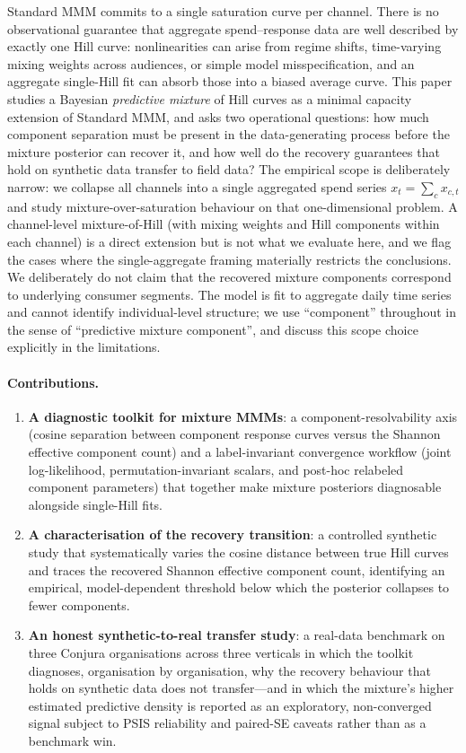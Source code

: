 \documentclass[11pt]{article}
\begin{document}
Standard MMM commits to a single saturation curve per channel. There is no observational guarantee that aggregate spend--response data are well described by exactly one Hill curve: nonlinearities can arise from regime shifts, time-varying mixing weights across audiences, or simple model misspecification, and an aggregate single-Hill fit can absorb those into a biased average curve. This paper studies a Bayesian \emph{predictive mixture} of Hill curves as a minimal capacity extension of Standard MMM, and asks two operational questions: how much component separation must be present in the data-generating process before the mixture posterior can recover it, and how well do the recovery guarantees that hold on synthetic data transfer to field data? The empirical scope is deliberately narrow: we collapse all channels into a single aggregated spend series $x_t = \sum_c x_{c,t}$ and study mixture-over-saturation behaviour on that one-dimensional problem. A channel-level mixture-of-Hill (with mixing weights and Hill components within each channel) is a direct extension but is not what we evaluate here, and we flag the cases where the single-aggregate framing materially restricts the conclusions. We deliberately do not claim that the recovered mixture components correspond to underlying consumer segments. The model is fit to aggregate daily time series and cannot identify individual-level structure; we use ``component'' throughout in the sense of ``predictive mixture component'', and discuss this scope choice explicitly in the limitations.

\paragraph{Contributions.}
\begin{enumerate}
    \item \textbf{A diagnostic toolkit for mixture MMMs}: a component-resolvability axis (cosine separation between component response curves versus the Shannon effective component count) and a label-invariant convergence workflow (joint log-likelihood, permutation-invariant scalars, and post-hoc relabeled component parameters) that together make mixture posteriors diagnosable alongside single-Hill fits.
    \item \textbf{A characterisation of the recovery transition}: a controlled synthetic study that systematically varies the cosine distance between true Hill curves and traces the recovered Shannon effective component count, identifying an empirical, model-dependent threshold below which the posterior collapses to fewer components.
    \item \textbf{An honest synthetic-to-real transfer study}: a real-data benchmark on three Conjura organisations across three verticals in which the toolkit diagnoses, organisation by organisation, why the recovery behaviour that holds on synthetic data does not transfer---and in which the mixture's higher estimated predictive density is reported as an exploratory, non-converged signal subject to PSIS reliability and paired-SE caveats rather than as a benchmark win.
\end{enumerate}
\end{document}
